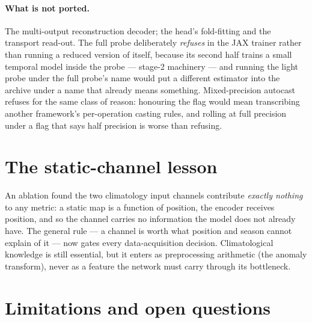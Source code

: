 \documentclass[10pt]{article}
\begin{document}
\paragraph{What is not ported.} The multi-output reconstruction decoder; the
head's fold-fitting and the transport read-out. The full probe deliberately
\emph{refuses} in the JAX trainer rather than running a reduced version of
itself, because its second half trains a small temporal model inside the
probe --- stage-2 machinery --- and running the light probe under the full
probe's name would put a different estimator into the archive under a name
that already means something. Mixed-precision autocast refuses for the same
class of reason: honouring the flag would mean transcribing another
framework's per-operation casting rules, and rolling at full precision
under a flag that says half precision is worse than refusing.

\section{The static-channel lesson}\label{sec:static}

An ablation found the two climatology input channels contribute
\emph{exactly nothing} to any metric: a static map is a function of
position, the encoder receives position, and so the channel carries no
information the model does not already have. The general rule --- a
channel is worth what position and season cannot explain of it ---
now gates every data-acquisition decision. Climatological knowledge is
still essential, but it enters as preprocessing arithmetic (the anomaly
transform), never as a feature the network must carry through its
bottleneck.

\section{Limitations and open questions}\label{sec:limits}
\end{document}
